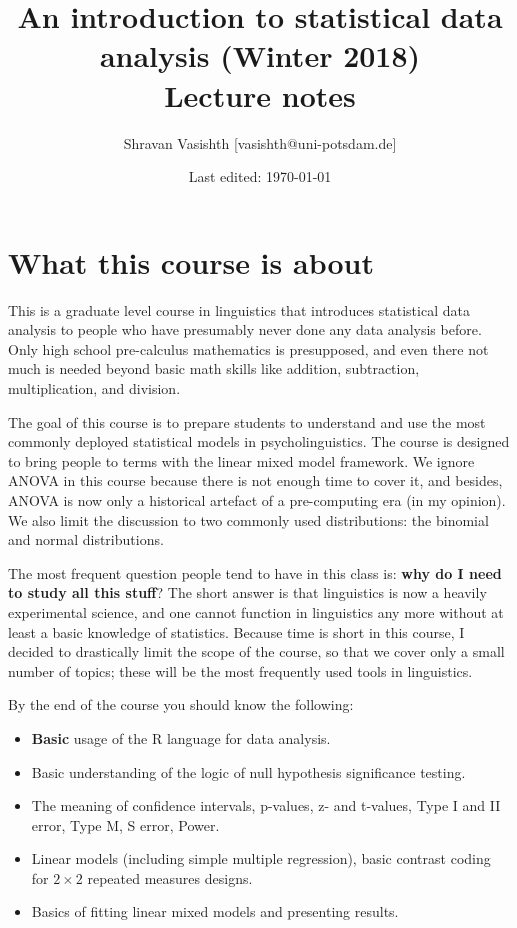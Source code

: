 \documentclass[12pt]{book}\usepackage[]{graphicx}\usepackage[]{color}
\begin{document}
\title{An introduction to statistical data analysis (Winter 2018)\\ Lecture notes}
\author{Shravan Vasishth [vasishth@uni-potsdam.de]}
\date{Last edited: \today}
\maketitle

\frontmatter

\tableofcontents

\mainmatter





\chapter{What this course is about}

This is a graduate level course in linguistics that introduces statistical data analysis to people who have presumably never done any data analysis before. Only high school pre-calculus mathematics is presupposed, and even there not much is needed beyond basic math skills like addition, subtraction, multiplication, and division.

The goal of this course is to prepare students to understand and use the most commonly deployed statistical models in psycholinguistics. The course is designed to bring people to terms with the linear mixed model framework. We ignore ANOVA in this course because there is not enough time to cover it, and besides, ANOVA is now only a historical artefact of a pre-computing era (in my opinion). We also limit the discussion to two commonly used distributions: the binomial and normal distributions.

The most frequent question people tend to have in this class is: \textbf{why do I need to study all this stuff}? The short answer is that linguistics is now a heavily experimental science, and one cannot function in linguistics any more without at least a basic knowledge of statistics. 
Because time is short in this course, I decided to drastically limit the scope of the course, so that we cover only a small number of topics; these will be the most frequently used tools in linguistics.

By the end of the course you should know the following:

\begin{itemize}
\item \textbf{Basic} usage of the R language for data analysis.
\item Basic understanding of the logic of null hypothesis significance testing.
\item The meaning of confidence intervals, p-values, z- and t-values, Type I and II error, Type M, S error, Power. 
\item Linear models (including simple multiple regression), basic contrast coding for $2\times 2$ repeated measures designs.
\item Basics of fitting linear mixed models and presenting results.
\end{itemize}
\end{document}
